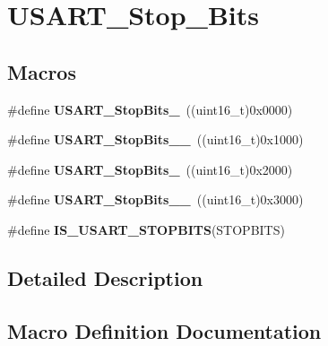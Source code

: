 \hypertarget{group___u_s_a_r_t___stop___bits}{}\section{U\+S\+A\+R\+T\+\_\+\+Stop\+\_\+\+Bits}
\label{group___u_s_a_r_t___stop___bits}
\subsection*{Macros}
\begin{DoxyCompactItemize}
\item 
\hypertarget{group___u_s_a_r_t___stop___bits_gae2cb35620ba001f0d63e9e0be93e4a05}{}\#define {\bfseries U\+S\+A\+R\+T\+\_\+\+Stop\+Bits\+\_}~((uint16\+\_\+t)0x0000)\label{group___u_s_a_r_t___stop___bits_gae2cb35620ba001f0d63e9e0be93e4a05}

\item 
\hypertarget{group___u_s_a_r_t___stop___bits_ga2ad06e3acfb691735d05ab9a314e2e32}{}\#define {\bfseries U\+S\+A\+R\+T\+\_\+\+Stop\+Bits\+\_\+\_}~((uint16\+\_\+t)0x1000)\label{group___u_s_a_r_t___stop___bits_ga2ad06e3acfb691735d05ab9a314e2e32}

\item 
\hypertarget{group___u_s_a_r_t___stop___bits_ga652058b6be2f48ac0d82d0e75537fc81}{}\#define {\bfseries U\+S\+A\+R\+T\+\_\+\+Stop\+Bits\+\_}~((uint16\+\_\+t)0x2000)\label{group___u_s_a_r_t___stop___bits_ga652058b6be2f48ac0d82d0e75537fc81}

\item 
\hypertarget{group___u_s_a_r_t___stop___bits_ga30897cc46d5b3790a9b14ffaba354527}{}\#define {\bfseries U\+S\+A\+R\+T\+\_\+\+Stop\+Bits\+\_\+\_}~((uint16\+\_\+t)0x3000)\label{group___u_s_a_r_t___stop___bits_ga30897cc46d5b3790a9b14ffaba354527}

\item 
\#define {\bfseries I\+S\+\_\+\+U\+S\+A\+R\+T\+\_\+\+S\+T\+O\+P\+B\+I\+T\+S}(S\+T\+O\+P\+B\+I\+T\+S)
\end{DoxyCompactItemize}


\subsection{Detailed Description}


\subsection{Macro Definition Documentation}
\hypertarget{group___u_s_a_r_t___stop___bits_ga6f9153c1fbee1058ba26ec88f0f20828}{}
